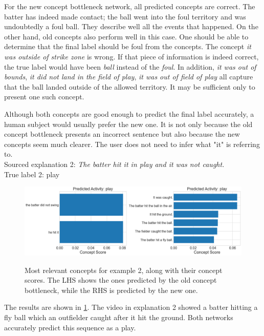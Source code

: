 For the new concept bottleneck network, all predicted concepts are correct.
The batter has indeed made contact; the ball went into the foul territory and was undoubtedly a foul ball.
They describe well all the events that happened.
On the other hand, old concepts also perform well in this case.
One should be able to determine that the final label should be foul from the concepts. 
The concept \emph{it was outside of strike zone} is wrong. 
If that piece of information is indeed correct, the true label would have been \emph{ball} instead of the \emph{foul}.
In addition, \emph{it was out of bounds}, \emph{it did not land in the field of play}, \emph{it was out of field of play} all capture that the ball landed outside of the allowed territory.
It may be sufficient only to present one such concept.

Although both concepts are good enough to predict the final label accurately, a human subject would usually prefer the new one.
It is not only because the old concept bottleneck presents an incorrect sentence but also because the new concepts seem much clearer.
The user does not need to infer what "it" is referring to. \\

Sourced explanation 2: \emph{The batter hit it in play and it was not caught.} \\
True label 2: play

\begin{figure}[h]
\caption{Most relevant concepts for example 2, along with their concept scores. The LHS shows the ones predicted by the old concept bottleneck, while the RHS is predicted by the new one.}
\centering
\includegraphics[width=\textwidth]{concept-bottleneck-pipeline/expalantions_concepts2.png}
\label{concepts-results-2}
\end{figure}

The results are shown in \ref{concepts-results-2}.
The video in explanation 2 showed a batter hitting a fly ball which an outfielder caught after it hit the ground.
Both networks accurately predict this sequence as a play.

